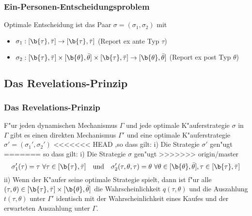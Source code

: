\begin{frame}
  \frametitle{Ein-Personen-Entscheidungsproblem}
  \justifying
  \justifying
  Optimale Entscheidung ist das Paar $\sigma = (\sigma_{1}, \sigma_{2})$ mit
  \begin{itemize}
    \item $\sigma_{1}: [ \b{\tau} , \bar{\tau} ] \rightarrow [ \b{\tau} , \bar{\tau} ]$ (Report ex ante Typ $\tau$)
    \item $\sigma_{2}: [ \b{\tau} , \bar{\tau} ] \times [ \b{\theta} , \bar{\theta} ]
    \times [ \b{\tau} , \bar{\tau} ]  \rightarrow [ \b{\theta} , \bar{\theta} ]$ (Report ex post Typ $\theta$)
  \end{itemize}
\end{frame}

\subsection{Das Revelations-Prinzip}
\begin{frame}
  \frametitle{Das Revelations-Prinzip}
  \justifying
  \begin{thmP}
    F"ur jeden dynamischen Mechanismus $\Gamma$ und jede optimale K"auferstrategie $\sigma$ in $\Gamma$ gibt es
    einen direkten Mechanismus $\Gamma'$ und eine optimale K"auferstrategie $\sigma' =(\sigma_{1}', \sigma_{2}')$
<<<<<<< HEAD
    ,so dass gilt: \newline \newline
    i) Die Strategie $\sigma'$ gen"ugt
=======
    so dass gilt: \newline \newline
    i) Die Strategie $\sigma$ gen"ugt
>>>>>>> origin/master
    \begin{equation*}
      \sigma_{1}' (\tau) = \tau \ \forall  \tau \in [\b{\tau} , \bar{\tau} ]
      \quad \text{und} \quad
      \sigma_{2}' (\tau, \theta, \tau) = \theta \ \forall  \theta \in [\b{\theta} , \bar{\theta} ], \tau \in [\b{\tau} , \bar{\tau} ]
    \end{equation*}
    ii) Wenn der K"aufer seine optimale Strategie spielt, dann ist f"ur alle
    $(\tau, \theta) \in [\b{\tau} , \bar{\tau} ] \times [\b{\theta} , \bar{\theta} ] $ die
    Wahrscheinlichkeit $q( \tau, \theta)$ und die Auszahlung $t(\tau, \theta)$ unter $\Gamma'$ identisch mit der
    Wahrscheinlichkeit eines Kaufes und der erwarteten Auszahlung unter $\Gamma$.
  \end{thmP}
\end{frame}

